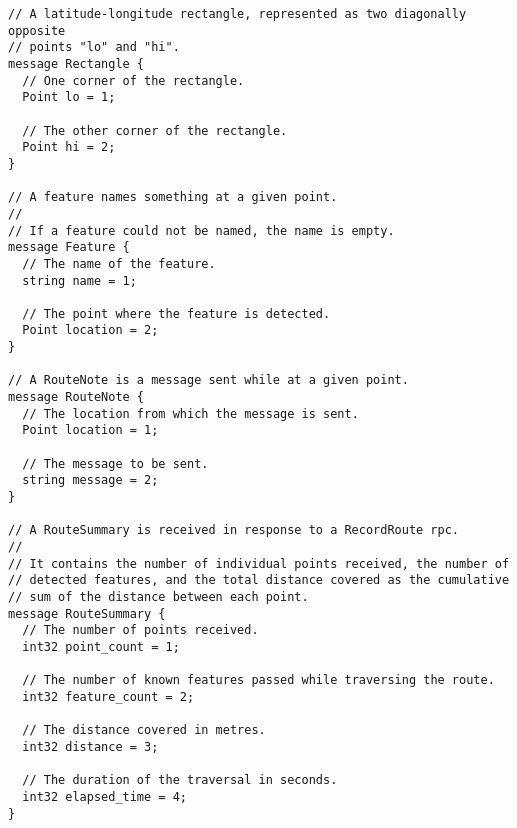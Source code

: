 \begin{verbatim}
// A latitude-longitude rectangle, represented as two diagonally opposite
// points "lo" and "hi".
message Rectangle {
  // One corner of the rectangle.
  Point lo = 1;

  // The other corner of the rectangle.
  Point hi = 2;
}

// A feature names something at a given point.
//
// If a feature could not be named, the name is empty.
message Feature {
  // The name of the feature.
  string name = 1;

  // The point where the feature is detected.
  Point location = 2;
}

// A RouteNote is a message sent while at a given point.
message RouteNote {
  // The location from which the message is sent.
  Point location = 1;

  // The message to be sent.
  string message = 2;
}

// A RouteSummary is received in response to a RecordRoute rpc.
//
// It contains the number of individual points received, the number of
// detected features, and the total distance covered as the cumulative
// sum of the distance between each point.
message RouteSummary {
  // The number of points received.
  int32 point_count = 1;

  // The number of known features passed while traversing the route.
  int32 feature_count = 2;

  // The distance covered in metres.
  int32 distance = 3;

  // The duration of the traversal in seconds.
  int32 elapsed_time = 4;
}
\end{verbatim}
